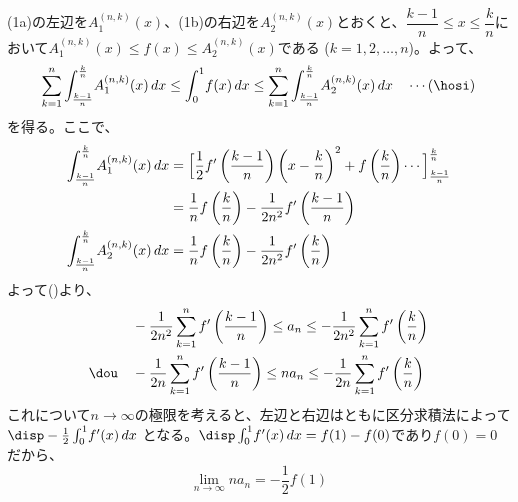 (1a)の左辺を$A_1^{(n,k)}(x)$、(1b)の右辺を$A_2^{(n,k)}(x)$とおくと、$\dfrac{k-1}{n}\le x\le\dfrac{k}{n}$において$A_1^{(n,k)}(x)\le f(x)\le A_2^{(n,k)}(x)$である ($k=1,2,\dots,n$)。よって、
\[ \sum_{k=1}^n \int_{\frac{k-1}{n}}^{\frac{k}{n}}\!A_1^{(n,k)}(x) \,dx \le \int_0^1\! f(x) \,dx \le \sum_{k=1}^n \int_{\frac{k-1}{n}}^{\frac{k}{n}}\!A_2^{(n,k)}(x) \,dx \quad\cdots\text{(\hosi)} \]
を得る。ここで、
\begin{align*}
 \int_{\frac{k-1}{n}}^{\frac{k}{n}}\!A_1^{(n,k)}(x)\,dx &=\Bigl[\frac{1}{2}f'\left(\frac{k-1}{n}\right)\left(x-\frac{k}{n}\right)^2+f\left(\frac{k}{n}\right)\cdots\Bigr]^{\frac{k}{n}}_{\frac{k-1}{n}} \\
 &=\frac{1}{n}f\left(\frac{k}{n}\right)-\frac{1}{2n^2}f'\left(\frac{k-1}{n}\right) \\
 \int_{\frac{k-1}{n}}^{\frac{k}{n}}\!A_2^{(n,k)}(x)\,dx &=\frac{1}{n}f\left(\frac{k}{n}\right)-\frac{1}{2n^2}f'\left(\frac{k}{n}\right)
\end{align*}
よって(\hosi)より、
\begin{align*}
 &-\frac{1}{2n^2}\sum_{k=1}^nf'\left(\frac{k-1}{n}\right)\le a_n \le -\frac{1}{2n^2}\sum_{k=1}^nf'\left(\frac{k}{n}\right) \\
 \dou\quad & -\frac{1}{2n}\sum_{k=1}^nf'\left(\frac{k-1}{n}\right)\le na_n \le -\frac{1}{2n}\sum_{k=1}^nf'\left(\frac{k}{n}\right)
\end{align*}
これについて$n\to\infty$の極限を考えると、左辺と右辺はともに区分求積法によって $\disp -\frac{1}{2}\int_0^1\! f'(x) \,dx$ となる。$\disp \int_0^1\!f'(x)\,dx=f(1)-f(0)$であり$f(0)=0$だから、
\[ \lim_{n\to\infty} na_n=-\frac{1}{2}f(1) \]